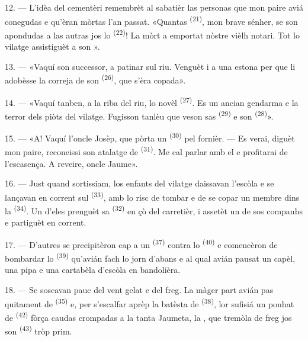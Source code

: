 12. --- L'idèa del cementèri remembrèt al sabatièr las personas que mon paire
aviá conegudas e qu'èran mòrtas l'an passat. «Quantas 
\textsuperscript{(21)}, mon brave sénher, se son apondudas a las autras jos lo
 \textsuperscript{(22)}! La mòrt a emportat nòstre vièlh notari.
Tot lo vilatge assistiguèt a son ».

13. --- «Vaquí son successor, a patinar sul riu. Venguèt i a una estona per que
li adobèsse la correja de son  \textsuperscript{(26)}, que s'èra
copada».

14. --- «Vaquí tanben, a la riba del riu, lo novèl 
\textsuperscript{(27)}. Es un ancian gendarma e la terror dels piòts del vilatge.
Fugisson tanlèu que veson sas  \textsuperscript{(29)} e son
 \textsuperscript{(28)}».

15. --- «A! Vaquí l'oncle Josèp, que pòrta un 
\textsuperscript{(30)} pel fornièr. --- Es verai, diguèt mon paire, reconeissi son
atalatge de  \textsuperscript{(31)}. Me cal parlar amb el e
profitarai de l'escasença. A reveire, oncle Jaume».

16. --- Just quand sortissiam, los enfants del vilatge daissavan l'escòla e se
lançavan en corrent sul  \textsuperscript{(33)}, amb lo risc de
tombar e de se copar un membre dins la  \textsuperscript{(34)}. Un
d'eles prenguèt sa  \textsuperscript{(32)} en çò del carretièr, i
assetèt un de sos companhs e partiguèt en corrent.

17. --- D'autres se precipitèron cap a un 
\textsuperscript{(37)} contra lo  \textsuperscript{(40)} e
comencèron de bombardar lo  \textsuperscript{(39)} qu'avián
fach lo jorn d'abans e al qual avián pausat un capèl, una pipa e una cartabèla
d'escòla en bandolièra.

18. --- Se soscavan pauc del vent gelat e del freg. La màger part avián pas
quitament de  \textsuperscript{(35)} e, per s'escalfar aprèp la
batèsta de  \textsuperscript{(38)}, lor sufisiá un ponhat de
 \textsuperscript{(42)} fòrça caudas crompadas a la tanta
Jaumeta, la , que tremòla de freg jos son 
\textsuperscript{(43)} tròp prim.

